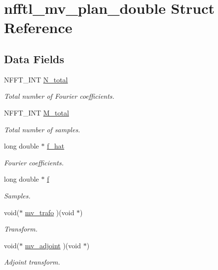 \hypertarget{structnfftl__mv__plan__double}{\section{nfftl\-\_\-mv\-\_\-plan\-\_\-double Struct Reference}
\label{structnfftl__mv__plan__double}
}
\subsection*{Data Fields}
\begin{DoxyCompactItemize}
\item 
N\-F\-F\-T\-\_\-\-I\-N\-T \hyperlink{structnfftl__mv__plan__double_abd421e5b3a95756044f9d392546ca238}{N\-\_\-total}
\begin{DoxyCompactList}\small\item\em Total number of Fourier coefficients. \end{DoxyCompactList}\item 
N\-F\-F\-T\-\_\-\-I\-N\-T \hyperlink{structnfftl__mv__plan__double_ab3cee398386f6d47f5ef9adc87ba860e}{M\-\_\-total}
\begin{DoxyCompactList}\small\item\em Total number of samples. \end{DoxyCompactList}\item 
long double $\ast$ \hyperlink{structnfftl__mv__plan__double_add804289931e55388070ee495c3e5072}{f\-\_\-hat}
\begin{DoxyCompactList}\small\item\em Fourier coefficients. \end{DoxyCompactList}\item 
long double $\ast$ \hyperlink{structnfftl__mv__plan__double_ae6c4a0204a54f2a37a0acf2b3f5a0c0c}{f}
\begin{DoxyCompactList}\small\item\em Samples. \end{DoxyCompactList}\item 
void($\ast$ \hyperlink{structnfftl__mv__plan__double_aff66252bd97fa6d73d7e137d888bb625}{mv\-\_\-trafo} )(void $\ast$)
\begin{DoxyCompactList}\small\item\em Transform. \end{DoxyCompactList}\item 
void($\ast$ \hyperlink{structnfftl__mv__plan__double_a804a64f2fb25ad91487fbcc186d784e0}{mv\-\_\-adjoint} )(void $\ast$)
\begin{DoxyCompactList}\small\item\em Adjoint transform. \end{DoxyCompactList}\end{DoxyCompactItemize}


